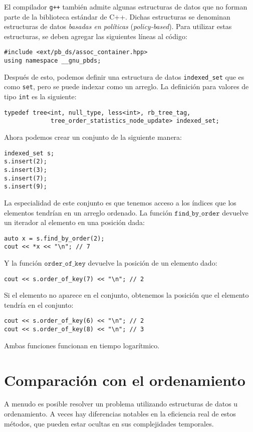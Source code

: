 El compilador \texttt{g++} también admite
algunas estructuras de datos que no forman parte
de la biblioteca estándar de C++.
Dichas estructuras se denominan estructuras de datos \emph{basadas en políticas}
(\textit{policy-based}).
Para utilizar estas estructuras, se deben
agregar las siguientes líneas al código:
\begin{lstlisting}
#include <ext/pb_ds/assoc_container.hpp>
using namespace __gnu_pbds;
\end{lstlisting}
Después de esto, podemos definir una estructura de datos \texttt{indexed\_set} que
es como \texttt{set}, pero se puede indexar como un arreglo.
La definición para valores de tipo \texttt{int} es la siguiente:
\begin{lstlisting}
typedef tree<int, null_type, less<int>, rb_tree_tag,
             tree_order_statistics_node_update> indexed_set;
\end{lstlisting}
Ahora podemos crear un conjunto de la siguiente manera:
\begin{lstlisting}
indexed_set s;
s.insert(2);
s.insert(3);
s.insert(7);
s.insert(9);
\end{lstlisting}
La especialidad de este conjunto es que tenemos acceso a
los índices que los elementos tendrían en un arreglo ordenado.
La función $\texttt{find\_by\_order}$ devuelve
un iterador al elemento en una posición dada:
\begin{lstlisting}
auto x = s.find_by_order(2);
cout << *x << "\n"; // 7
\end{lstlisting}
Y la función $\texttt{order\_of\_key}$
devuelve la posición de un elemento dado:
\begin{lstlisting}
cout << s.order_of_key(7) << "\n"; // 2
\end{lstlisting}
Si el elemento no aparece en el conjunto,
obtenemos la posición que el elemento tendría
en el conjunto:
\begin{lstlisting}
cout << s.order_of_key(6) << "\n"; // 2
cout << s.order_of_key(8) << "\n"; // 3
\end{lstlisting}
Ambas funciones funcionan en tiempo logarítmico.

\section{Comparación con el ordenamiento}

A menudo es posible resolver un problema
utilizando estructuras de datos u ordenamiento.
A veces hay diferencias notables
en la eficiencia real de estos métodos,
que pueden estar ocultas en sus complejidades temporales.


